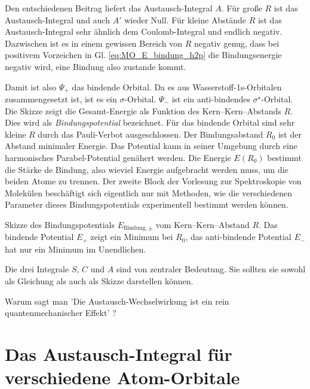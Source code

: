 Den entschiedenen Beitrag liefert das Austausch-Integral $A$. Für große $R$ ist das Austausch-Integral und auch $A'$ wieder Null. Für kleine Abstände $R$ ist das Austausch-Integral sehr ähnlich dem Coulomb-Integral und endlich negativ. Dazwischen ist es in einem gewissen Bereich von $R$ negativ genug, dass bei positivem Vorzeichen in Gl. \ref{eq:MO_E_bindung_h2p} die Bindungsenergie negativ wird, eine Bindung also zustande kommt.

Damit ist also $\Psi_+$ das bindende Orbital. Da es aus Wasserstoff-1s-Orbitalen zusammengesetzt ist, ist es ein $\sigma$-Orbital. $\Psi_-$ ist ein anti-bindendes $\sigma^\star$-Orbital. Die Skizze zeigt die Gesamt-Energie als Funktion des Kern--Kern--Abstands $R$. Dies wird als \emph{Bindungspotential} bezeichnet. Für das bindende Orbital sind sehr kleine $R$ durch das Pauli-Verbot ausgeschlossen.
Der Bindungsabstand $R_0$ ist der Abstand minimaler Energie. Das Potential kann in seiner Umgebung durch eine harmonisches Parabel-Potential genähert werden. Die Energie $E(R_0)$ bestimmt die Stärke de Bindung, also wieviel Energie aufgebracht werden muss, um die beiden Atome zu trennen. Der zweite Block der Vorlesung zur Spektroskopie von Molekülen beschäftigt sich eigentlich nur mit Methoden, wie die verschiedenen Parameter dieses Bindungspotentials experimentell bestimmt werden können.



\begin{marginfigure}

\caption{Skizze des Bindungspotentials $E_{\text{Bindung}, \pm}$ vom Kern--Kern--Abstand $R$. Das bindende Potential $E_+$ zeigt ein Minimum bei $R_0$, das anti-bindende Potential $E_-$ hat nur ein Minimum im Unendlichen.}
\end{marginfigure}




\begin{questions} 
\item Die drei Integrale $S$, $C$ und $A$ sind von zentraler Bedeutung. Sie sollten sie sowohl als Gleichung als auch als Skizze darstellen können.

\item Warum sagt man 'Die Austausch-Wechselwirkung ist ein rein quantenmechanischer Effekt' ?
\end{questions}



\section{Das Austausch-Integral für verschiedene Atom-Orbitale}

